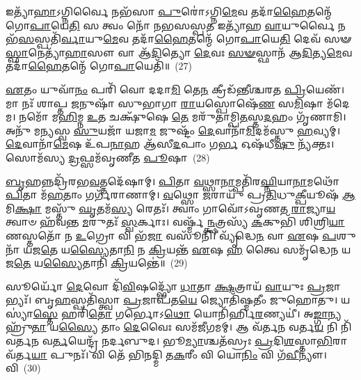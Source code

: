 𑌇𑌤𑍍𑌯𑌾᳴\-\ul{𑌹𑌾}\-\-𑌽𑌗𑍍𑌨𑌿𑌰𑍍𑌵𑍈 𑌨𑌭᳴𑌸𑌾 \ul{𑌪𑍁}\-𑌰𑍋॑\-𑌽𑌗𑍍𑌨𑌿\-\ul{𑌮𑍇}\-𑌵 𑌤𑌦𑌾᳴\-\ul{𑌹𑍈}\-𑌤𑌨𑍍𑌮𑍇᳴ 𑌗𑍋\-\ul{𑌪𑌾}\-𑌯𑍇\-\ul{𑌤𑌿} 𑌸 𑌤𑍍𑌵𑌂 𑌨𑍋᳴ 𑌨𑌭𑌸𑌸𑍍𑌪\-\ul{𑌤} 𑌇𑌤𑍍𑌯𑌾᳴𑌹 \ul{𑌵𑌾}\-𑌯𑍁𑌰𑍍𑌵𑍈 𑌨𑌭᳴\-\ul{𑌸}\-𑌸𑍍𑌪𑌤𑌿᳴\-\ul{𑌰𑍍𑌵𑌾}\-𑌯𑍁\-\ul{𑌮𑍇}\-𑌵 𑌤𑌦𑌾᳴\-\ul{𑌹𑍈}\-𑌤𑌨𑍍𑌮𑍇᳴ 𑌗𑍋\-\ul{𑌪𑌾}\-𑌯𑍇\-\ul{𑌤𑌿} 𑌦𑍇𑌵᳴ 𑌸𑍟\-\ul{𑌸𑍍𑌫𑌾}\-𑌨𑍇𑌤𑍍𑌯𑌾᳴\-\ul{𑌹𑌾}\-𑌸𑍗 𑌵𑌾 𑌆᳴\-\ul{𑌦𑌿}\-𑌤𑍍𑌯𑍋 \ul{𑌦𑍇}\-𑌵𑌃 \ul{𑌸}\-\-\ul{𑍟}\-𑌸𑍍𑌫𑌾𑌨᳴ 𑌆\-\ul{𑌦𑌿}\-𑌤𑍍𑌯\-\ul{𑌮𑍇}\-𑌵 𑌤𑌦𑌾᳴\-\ul{𑌹𑍈}\-𑌤𑌨𑍍𑌮𑍇᳴ 𑌗𑍋\-\ul{𑌪𑌾}\-𑌯𑍇𑌤𑌿᳴॥~(27)

{\anuvakamend[{𑌕𑍁𑌸𑍀᳴\-\ul{𑌦}\-𑌨𑍍𑌤𑍍𑌵𑌨𑍍𑌨᳴ 𑌏𑌨𑌮𑍋\-\ul{𑌷𑍇}\-𑌦𑍍𑌯𑌦𑌿᳴ \ul{𑌪𑍁}\-𑌰 𑌆᳴\-\ul{𑌦𑌿}\-𑌤𑍍𑌯\-\ul{𑌮𑍇}\-𑌵 𑌤𑌦𑌾᳴\-\ul{𑌹𑍈}\-𑌤𑌨𑍍𑌮𑍇᳴ 𑌗𑍋\-\ul{𑌪𑌾}\-𑌯𑍇𑌤𑌿᳴}]}%

\-\ul{𑌏}\-𑌤𑌂 𑌯𑍁𑌵𑌾᳴\-\ul{𑌨𑌂} 𑌪𑌰𑌿᳴ 𑌵𑍋 𑌦𑌦𑌾\-\ul{𑌮𑌿} 𑌤𑍇\-\ul{𑌨} 𑌕𑍍𑌰𑍀𑌡᳴𑌨𑍍𑌤𑍀𑌶𑍍𑌚𑌰𑌤 \ul{𑌪𑍍𑌰𑌿}\-𑌯𑍇𑌣᳴। 𑌮𑌾 𑌨𑌃᳴ 𑌶𑌾𑌪𑍍𑌤 \ul{𑌜}\-𑌨𑍁𑌷𑌾᳴ 𑌸𑍁𑌭𑌾𑌗𑌾 \ul{𑌰𑌾}\-𑌯𑌸𑍍𑌪𑍋𑌷𑍇᳴\-\ul{𑌣} 𑌸\-\ul{𑌮𑌿}\-𑌷𑌾 𑌮᳴𑌦𑍇𑌮। 𑌨𑌮𑍋᳴ 𑌮\-\ul{𑌹𑌿}\-𑌮𑍍𑌨 \ul{𑌉}\-𑌤 𑌚𑌕𑍍𑌷𑍁᳴𑌷𑍇 \ul{𑌤𑍇} 𑌮𑌰𑍁᳴𑌤𑌾𑌮𑍍𑌪𑌿\-\ul{𑌤}\-𑌸𑍍𑌤\-\ul{𑌦}\-𑌹𑌂 𑌗𑍃᳴𑌣𑌾𑌮𑌿। 𑌅𑌨𑍁᳴ 𑌮𑌨𑍍𑌯𑌸𑍍𑌵 \ul{𑌸𑍁}\-𑌯𑌜𑌾᳴ 𑌯𑌜𑌾\-\ul{𑌮} 𑌜𑍁𑌷𑍍𑌟𑌂᳴ \ul{𑌦𑍇}\-𑌵𑌾𑌨𑌾᳴\-\ul{𑌮𑌿}\-𑌦𑌮᳴𑌸𑍍𑌤𑍁 \ul{𑌹}\-𑌵𑍍𑌯𑌮𑍍। \ul{𑌦𑍇}\-𑌵𑌾𑌨𑌾᳴\-\ul{𑌮𑍇}\-𑌷 𑌉᳴𑌪\-\ul{𑌨𑌾}\-𑌹 𑌆᳴𑌸𑍀\-\ul{𑌦}\-𑌪𑌾𑌂 𑌗\-\ul{𑌰𑍍𑌭} 𑌓𑌷᳴𑌧𑍀\-\ul{𑌷𑍁} 𑌨𑍍𑌯᳴𑌕𑍍𑌤𑌃। 𑌸𑍋𑌮᳴𑌸𑍍𑌯 \ul{𑌦𑍍𑌰}\-𑌫𑍍𑌸𑌮᳴𑌵𑍃𑌣𑍀𑌤 \ul{𑌪𑍂}\-𑌷𑌾~(28)

\-\ul{𑌬𑍃}\-𑌹𑌨𑍍𑌨𑌦𑍍𑌰𑌿᳴𑌰𑌭\-\ul{𑌵}\-𑌤𑍍𑌤𑌦𑍇᳴𑌷𑌾𑌮𑍍। \ul{𑌪𑌿}\-𑌤𑌾 \ul{𑌵}\-𑌥𑍍𑌸𑌾\-\ul{𑌨𑌾}\-𑌮𑍍𑌪𑌤𑌿᳴𑌰\-\ul{𑌘𑍍𑌨𑌿}\-𑌯𑌾\-\ul{𑌨𑌾}\-𑌮𑌥𑍋᳴ \ul{𑌪𑌿}\-𑌤𑌾 𑌮᳴\-\ul{𑌹}\-𑌤𑌾𑌂 𑌗𑌰𑍍𑌗᳴𑌰𑌾𑌣𑌾𑌮𑍍। \ul{𑌵}\-𑌥𑍍𑌸𑍋 \ul{𑌜}\-𑌰𑌾𑌯𑍁᳴ 𑌪𑍍𑌰\-\ul{𑌤𑌿}\-𑌧𑍁\-\ul{𑌕𑍍𑌪𑍀}\-𑌯𑍂𑌷᳴ \ul{𑌆}\-𑌮𑌿\-\ul{𑌕𑍍𑌷𑌾} 𑌮𑌸𑍍𑌤𑍁᳴ \ul{𑌘𑍃}\-𑌤𑌮᳴\-\ul{𑌸𑍍𑌯} 𑌰𑍇𑌤𑌃᳴। 𑌤𑍍𑌵𑌾𑌂 𑌗𑌾𑌵𑍋᳴\-𑌽𑌵𑍃𑌣𑌤 \ul{𑌰𑌾}\-𑌜𑍍𑌯𑌾\-\ul{𑌯} 𑌤𑍍𑌵𑌾𑍞 𑌹᳴𑌵𑌨𑍍𑌤 \ul{𑌮}\-𑌰𑍁𑌤𑌃᳴ \ul{𑌸𑍍𑌵}\-𑌰𑍍𑌕𑌾𑌃। 𑌵𑌰𑍍𑌷𑍍𑌮᳴\-\ul{𑌨𑍍𑌕𑍍𑌷}\-𑌤𑍍𑌰𑌸𑍍𑌯᳴ \ul{𑌕}\-𑌕𑍁𑌭𑌿᳴ 𑌶𑌿𑌶𑍍𑌰𑌿\-\ul{𑌯𑌾}\-𑌣𑌸𑍍𑌤𑌤𑍋᳴ 𑌨 \ul{𑌉}\-𑌗𑍍𑌰𑍋 𑌵𑌿 𑌭᳴\-\ul{𑌜𑌾} 𑌵𑌸𑍂᳴𑌨𑌿। 𑌵𑍍𑌯𑍃᳴𑌦𑍍𑌧𑍇\-\ul{𑌨} 𑌵𑌾 \ul{𑌏}\-𑌷 \ul{𑌪}\-𑌶𑍁𑌨𑌾᳴ 𑌯𑌜\-\ul{𑌤𑍇} 𑌯\-\ul{𑌸𑍍𑌯𑍈}\-𑌤𑌾\-\ul{𑌨𑌿} 𑌨 \ul{𑌕𑍍𑌰𑌿}\-𑌯𑌨𑍍𑌤᳴ \ul{𑌏}\-𑌷 \ul{𑌹} 𑌤𑍍𑌵𑍈 𑌸𑌮𑍃᳴𑌦𑍍𑌧𑍇𑌨 𑌯𑌜\-\ul{𑌤𑍇} 𑌯\-\ul{𑌸𑍍𑌯𑍈}\-𑌤𑌾𑌨𑌿᳴ \ul{𑌕𑍍𑌰𑌿}\-𑌯𑌨𑍍𑌤𑍇॑॥~(29)

{\anuvakamend[{\-\ul{𑌪𑍂}\-𑌷𑌾 \ul{𑌕𑍍𑌰𑌿}\-𑌯𑌨𑍍𑌤᳴ \ul{𑌏}\-𑌷𑍋॑\-𑌽𑌷𑍍𑌟𑍗 𑌚᳴}]}%

𑌸𑍂𑌰𑍍𑌯𑍋᳴ \ul{𑌦𑍇}\-𑌵𑍋 𑌦𑌿᳴\-\ul{𑌵𑌿}\-𑌷𑌦𑍍𑌭𑍍𑌯𑍋᳴ \ul{𑌧𑌾}\-𑌤𑌾 \ul{𑌕𑍍𑌷}\-𑌤𑍍𑌰𑌾𑌯᳴ \ul{𑌵𑌾}\-𑌯𑍁𑌃 \ul{𑌪𑍍𑌰}\-𑌜𑌾𑌭𑍍𑌯𑌃᳴। 𑌬𑍃\-\ul{𑌹}\-𑌸𑍍𑌪𑌤𑌿᳴𑌸𑍍𑌤𑍍𑌵𑌾 \ul{𑌪𑍍𑌰}\-𑌜𑌾𑌪᳴𑌤\-\ul{𑌯𑍇} 𑌜𑍍𑌯𑍋𑌤𑌿᳴𑌷𑍍𑌮𑌤𑍀𑌂 𑌜𑍁𑌹𑍋𑌤𑍁। 𑌯𑌸𑍍𑌯𑌾॑\-\ul{𑌸𑍍𑌤𑍇} 𑌹𑌰𑌿᳴\-\ul{𑌤𑍋} 𑌗𑌰𑍍𑌭𑍋\-𑌽\-\ul{𑌥𑍋} 𑌯𑍋𑌨𑌿᳴𑌰𑍍\mbox{}𑌹𑌿\-\ul{𑌰}\-𑌣𑍍𑌯𑌯𑍀॑। 𑌅\-\ul{𑌙𑍍𑌗𑌾}\-𑌨𑍍𑌯𑌹𑍍𑌰𑍁᳴\-\ul{𑌤𑌾} 𑌯\-\ul{𑌸𑍍𑌯𑍈} 𑌤𑌾𑌂 \ul{𑌦𑍇}\-𑌵𑍈𑌃 𑌸𑌮᳴𑌜𑍀𑌗𑌮𑌮𑍍। 𑌆 𑌵᳴𑌰𑍍𑌤𑌨 𑌵𑌰𑍍𑌤\-\ul{𑌯} 𑌨𑌿 𑌨𑌿᳴𑌵𑌰𑍍𑌤𑌨 𑌵\-\ul{𑌰𑍍𑌤}\-𑌯𑍇𑌨𑍍𑌦𑍍𑌰᳴ 𑌨𑌰𑍍𑌦𑌬𑍁𑌦। 𑌭𑍂\-\ul{𑌮𑍍𑌯𑌾}\-𑌶𑍍𑌚𑌤᳴𑌸𑍍𑌰𑌃 \ul{𑌪𑍍𑌰}\-𑌦𑌿\-\ul{𑌶}\-𑌸𑍍𑌤𑌾\-\ul{𑌭𑌿}\-𑌰𑌾 𑌵᳴𑌰𑍍𑌤\-\ul{𑌯𑌾} 𑌪𑍁𑌨𑌃᳴। 𑌵𑌿 𑌤𑍇᳴ 𑌭𑌿𑌨𑌦𑍍𑌮𑌿 𑌤\-\ul{𑌕}\-𑌰𑍀𑌂 𑌵𑌿 𑌯𑍋\-\ul{𑌨𑌿𑌂} 𑌵𑌿 𑌗᳴\-\ul{𑌵𑍀}\-𑌨𑍍𑌯𑍗॑। 𑌵𑌿~(30)

